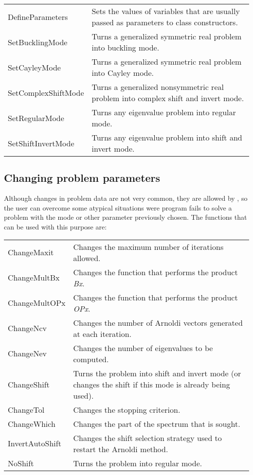 \begin{tabularx}{\textwidth}{LX}
	DefineParameters & Sets the values of variables that are usually passed as parameters to class constructors.\\
	SetBucklingMode & Turns a generalized symmetric real problem into buckling mode.\\
	SetCayleyMode & Turns a generalized symmetric real problem into Cayley mode.\\
	SetComplexShiftMode & Turns a generalized nonsymmetric real problem into complex shift and invert mode.\\
	SetRegularMode & Turns any eigenvalue problem into regular mode.\\
	SetShiftInvertMode & Turns any eigenvalue problem into shift and invert mode.\\
\end{tabularx}

\subsection{Changing problem parameters}

Although changes in problem data are not very common, they are allowed by \ARPP{}, so the user can overcome some atypical situations were program fails to solve a problem with the mode or other parameter previously chosen. The functions that can be used with this purpose are:

\begin{tabularx}{\textwidth}{LX}
	ChangeMaxit & Changes the maximum number of iterations allowed.\\
	ChangeMultBx & Changes the function that performs the product \textit{Bx}.\\
	ChangeMultOPx & Changes the function that performs the product \textit{OPx}.\\
	ChangeNcv & Changes the number of Arnoldi vectors generated at each iteration.\\
	ChangeNev & Changes the number of eigenvalues to be computed.\\
	ChangeShift & Turns the problem into shift and invert mode (or changes the shift if this mode is already being used).\\
	ChangeTol & Changes the stopping criterion.\\
	ChangeWhich & Changes the part of the spectrum that is sought.\\
	InvertAutoShift & Changes the shift selection strategy used to restart the Arnoldi method.\\
	NoShift & Turns the problem into regular mode.\\
\end{tabularx}

